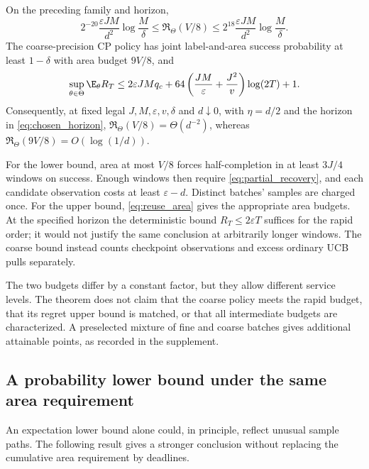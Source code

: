 \begin{theorem}
\label{thm:tradeoff}
On the preceding family and horizon,
\begin{equation}
 2^{-20}\frac{\varepsilon JM}{d^2}\log\frac M\delta
 \le\mathfrak R_\Theta(V/8)\le
 2^{18}\frac{\varepsilon JM}{d^2}\log\frac M\delta.
 \label{eq:rapid_matched}
\end{equation}
The coarse-precision CP policy has joint label-and-area success probability
at least $1-\delta$ with area budget $9V/8$, and
\begin{equation}
 \sup_{\theta\in\Theta}\E_\theta R_T\le
 2\varepsilon JM q_c+
 64\left(\frac{JM}{\varepsilon}+\frac{J^2}{v}\right)\log(2T)+1.
 \label{eq:coarse_regret}
\end{equation}
Consequently, at fixed legal $J,M,\varepsilon,v,\delta$ and $d\downarrow0$,
with $\eta=d/2$ and the horizon in \eqref{eq:chosen_horizon},
$\mathfrak R_\Theta(V/8)=\Theta(d^{-2})$, whereas
$\mathfrak R_\Theta(9V/8)=O(\log(1/d))$.
\end{theorem}

For the lower bound, area at most $V/8$ forces half-completion in at least
$3J/4$ windows on success. Enough windows then require
\eqref{eq:partial_recovery}, and each candidate observation costs at least
$\varepsilon-d$. Distinct batches' samples are charged once. For the upper
bound, \eqref{eq:reuse_area} gives the appropriate area budgets. At the specified
horizon the deterministic bound $R_T\le2\varepsilon T$ suffices for the rapid
order; it would not justify the same conclusion at arbitrarily longer windows.
The coarse bound instead counts checkpoint observations and excess ordinary
UCB pulls separately.

The two budgets differ by a constant factor, but they allow different service
levels. The theorem does not claim that the coarse policy meets the rapid
budget, that its regret upper bound is matched, or that all intermediate budgets
are characterized. A preselected mixture of fine and coarse batches gives
additional attainable points, as recorded in the supplement.

\subsection{A probability lower bound under the same area requirement}

An expectation lower bound alone could, in principle, reflect unusual sample
paths. The following result gives a stronger conclusion without replacing the
cumulative area requirement by deadlines.

